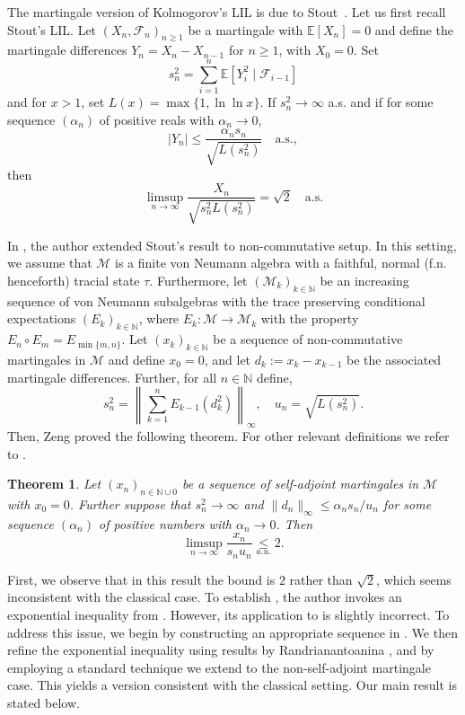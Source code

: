\documentclass[10pt]{amsart}
\newtheorem{thm}{Theorem}[section]
\theoremstyle{definition}
\theoremstyle{myremark}
\numberwithin{equation}{section}
\def\N{\mathbb N}
\newcommand{\CM}{\mathcal{M}}
\begin{document}
The martingale version of Kolmogorov's LIL \cite{kolmogoroff1929gesetz} is due to Stout~\cite{stout1970martingale}. Let us first recall Stout's LIL. Let $(X_n, \mathcal{F}_n)_{n \geq 1}$ be a martingale with $\mathbb{E}[X_n] = 0$ and define the martingale differences $Y_n = X_n - X_{n-1}$ for $n \geq 1$, with $X_0 = 0$. Set
\[
s_n^2 = \sum_{i=1}^n \mathbb{E}[Y_i^2 \mid \mathcal{F}_{i-1}]
\] and for $x>1$, set
$
L(x) = \max\{1, \ln \ln x\}.
$
If $s_n^2 \to \infty$ a.s. and if for some sequence $(\alpha_n)$ of positive reals with $\alpha_n \to 0$,
\begin{equation}
|Y_n| \le \frac{\alpha_n s_n}{\sqrt{L(s_n^2)}} \quad \text{a.s.},
\label{eq:KolmogorovCondition}
\end{equation}
then
\[
\limsup_{n \to \infty} \frac{X_n}{\sqrt{s_n^2 L(s_n^2)}} = \sqrt{2} \quad \text{a.s.}
\]

In \cite{zeng2015kolmogorov}, the author extended  Stout's result to non-commutative setup. In this setting, we assume that $\CM$ is a finite von Neumann algebra with a faithful, normal (f.n. henceforth) tracial state $\tau$. Furthermore, let $(\CM_k)_{k \in \N}$ be an increasing sequence of von Neumann subalgebras with the trace preserving conditional expectations $(E_k)_{k \in \N}$, where $E_k: \CM \to \CM_k$ with the property $E_n \circ E_m= E_{\min\{m,n\}}$. Let $(x_k)_{k \in \N}$ be a sequence of non-commutative martingales in $\CM$ and define $x_0=0$, and let $d_k:= x_k - x_{k-1}$ be the associated martingale differences. Further, for all $n \in \N$ define,
\[
s_n^2 = \left\| \sum_{k=1}^n E_{k-1}(d_k^2) \right\|_\infty, \quad u_n = \sqrt{L(s_n^2)}.
\]
Then, Zeng proved the following theorem. For other relevant definitions we refer to .
\begin{thm}\label{thm: zeng}
Let $(x_n)_{n \in \N \cup {0}}$ be a sequence of self-adjoint martingales in $\CM$ with $x_0=0$. Further suppose that $s_n^2 \to \infty$ and $\|d_n\|_\infty \le \alpha_n s_n / u_n$ for some sequence $(\alpha_n)$ of positive numbers with $\alpha_n \to 0$. Then
\[
\limsup_{n \to \infty} \frac{x_n}{s_n u_n} \underset{a.u.}{\leq } 2.
\]
\end{thm}

First, we observe that in this result the bound is $2$ rather than
$\sqrt{2}$, which seems inconsistent with the classical case. To
establish , the author invokes an exponential
inequality from \cite[Lemma~2.2]{junge2015noncommutative}. However,
its application to \cite[Theorem~1]{zeng2015kolmogorov} is
slightly incorrect. To address this issue, we begin by
constructing an appropriate sequence in . We
then refine the exponential inequality using results by
Randrianantoanina \cite{randrianantoanina2024triple}, and by employing
a standard technique we extend  to the
non-self-adjoint martingale case. This yields a version consistent with the classical setting. Our main result is stated
below.
\end{document}
